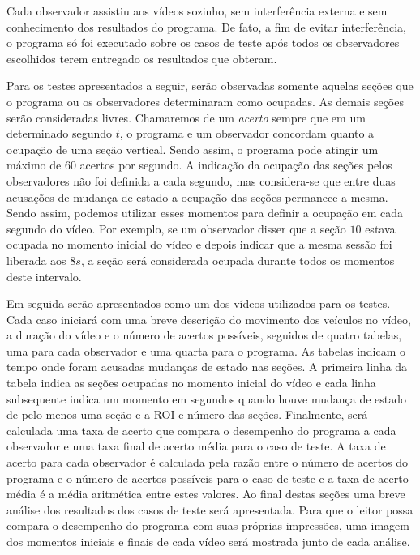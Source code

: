 Cada observador assistiu aos vídeos sozinho, sem interferência externa e sem conhecimento dos resultados do programa. De fato, a fim de evitar interferência, o programa só foi executado sobre os casos de teste após todos os observadores escolhidos terem entregado os resultados que obteram.

Para os testes apresentados a seguir, serão observadas somente aquelas seções que o programa ou os observadores determinaram como ocupadas. As demais seções serão consideradas livres. Chamaremos de um \textit{acerto} sempre que em um determinado segundo $t$, o programa e um observador concordam quanto a ocupação de uma seção vertical. Sendo assim, o programa pode atingir um máximo de $60$ acertos por segundo. A indicação da ocupação das seções pelos observadores não foi definida a cada segundo, mas considera-se que entre duas acusações de mudança de estado a ocupação das seções permanece a mesma. Sendo assim, podemos utilizar esses momentos para definir a ocupação em cada segundo do vídeo. Por exemplo, se um observador disser que a seção $10$ estava ocupada no momento inicial do vídeo e depois indicar que a mesma sessão foi liberada aos $8s$, a seção será considerada ocupada durante todos os momentos deste intervalo. 

Em seguida serão apresentados como um dos vídeos utilizados para os testes. Cada caso iniciará com uma breve descrição do movimento dos veículos no vídeo, a duração do vídeo e o número de acertos possíveis, seguidos de quatro tabelas, uma para cada observador e uma quarta para o programa. As tabelas indicam o tempo onde foram acusadas mudanças de estado nas seções. A primeira linha da tabela indica as seções ocupadas no momento inicial do vídeo e cada linha subsequente indica um momento em segundos quando houve mudança de estado de pelo menos uma seção e a ROI e número das seções. Finalmente, será calculada uma taxa de acerto que compara o desempenho do programa a cada observador e uma taxa final de acerto média para o caso de teste. A taxa de acerto para cada observador é calculada pela razão entre o número de acertos do programa e o número de acertos possíveis para o caso de teste e a taxa de acerto média é a média aritmética entre estes valores. Ao final destas seções uma breve análise dos resultados dos casos de teste será apresentada. Para que o leitor possa compara o desempenho do programa com suas próprias impressões, uma imagem dos momentos iniciais e finais de cada vídeo será mostrada junto de cada análise.


